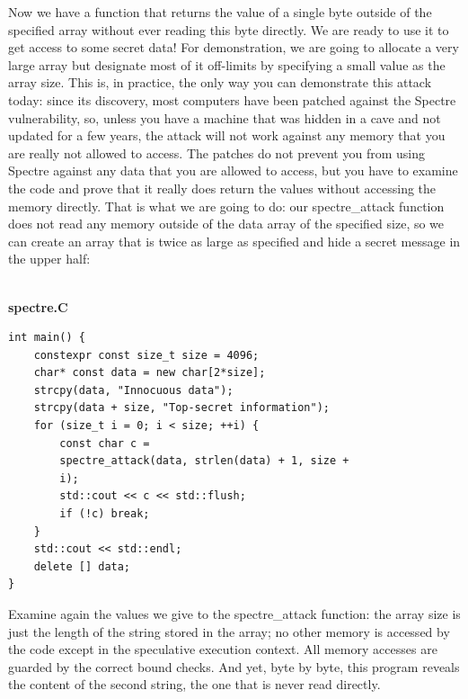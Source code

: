 Now we have a function that returns the value of a single byte outside of the specified array without ever reading this byte directly. We are ready to use it to get access to some secret data! For demonstration, we are going to allocate a very large array but designate most of it off-limits by specifying a small value as the array size. This is, in practice, the only way you can demonstrate this attack today: since its discovery, most computers have been patched against the Spectre vulnerability, so, unless you have a machine that was hidden in a cave and not updated for a few years, the attack will not work against any memory that you are really not allowed to access. The patches do not prevent you from using Spectre against any data that you are allowed to access, but you have to examine the code and prove that it really does return the values without accessing the memory directly. That is what we are going to do: our spectre\_attack function does not read any memory outside of the data array of the specified size, so we can create an array that is twice as large as specified and hide a secret message in the upper half:

\hspace*{\fill} \\ %
\noindent
\textbf{spectre.C}
\begin{lstlisting}[style=styleCXX]
int main() {
	constexpr const size_t size = 4096;
	char* const data = new char[2*size];
	strcpy(data, "Innocuous data");
	strcpy(data + size, "Top-secret information");
	for (size_t i = 0; i < size; ++i) {
		const char c =
		spectre_attack(data, strlen(data) + 1, size +
		i);
		std::cout << c << std::flush;
		if (!c) break;
	}
	std::cout << std::endl;
	delete [] data;
}
\end{lstlisting}

Examine again the values we give to the spectre\_attack function: the array size is just the length of the string stored in the array; no other memory is accessed by the code except in the speculative execution context. All memory accesses are guarded by the correct bound checks. And yet, byte by byte, this program reveals the content of the second string, the one that is never read directly.

